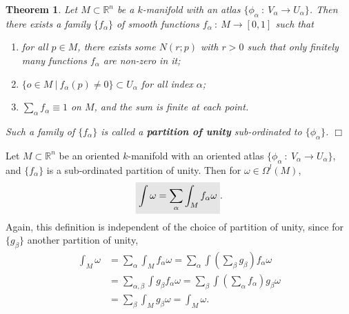 \documentclass[letter-paper]{tufte-book}
\newtheorem{theorem}{\color{pastel-blue}Theorem}[section]
\newcommand{\qedwhite}{\hfill \ensuremath{\Box}}
\newcommand{\highlight}[1]{\mathchoice%
  {\colorbox{black!10}{$\displaystyle#1$}}%
  {\colorbox{black!10}{$\textstyle#1$}}%
  {\colorbox{black!10}{$\scriptstyle#1$}}%
  {\colorbox{black!10}{$\scriptscriptstyle#1$}}}%
\begin{document}
\begin{theorem}
  Let $M \subset \mathbb{R}^n$ be a $k$-manifold with an atlas $\{\phi_\alpha\ :\ V_\alpha \to U_\alpha\}$. Then there exists a family $\{f_\alpha\}$ of smooth functions $f_\alpha\ :\ M \to [0, 1]$ such that
  \begin{enumerate}
    \item for all $p \in M$, there exists some $N(r; p)$ with $r>0$ such that only finitely many functions $f_\alpha$ are non-zero in it;
    \item $\{o \in M\ |\ f_\alpha(p) \neq 0\} \subset U_\alpha$ for all index $\alpha$;
    \item $\sum_\alpha f_\alpha \equiv 1$ on $M$, and the sum is finite at each point.
  \end{enumerate}
  Such a family of $\{f_\alpha\}$ is called a \textbf{partition of unity} sub-ordinated to $\{\phi_\alpha\}$. \qedwhite
\end{theorem}

Let $M \subset \mathbb{R}^n$ be an oriented $k$-manifold with an oriented atlas $\{\phi_\alpha\ :\ V_\alpha \to U_\alpha\}$, and $\{f_\alpha\}$ is a sub-ordinated partition of unity. Then for $\omega \in \Omega^l(M)$,
\begin{equation}
  \highlight{\int\omega = \sum_\alpha \int_M f_\alpha \omega}.
\end{equation}
Again, this definition is independent of the choice of partition of unity, since for $\{g_\beta\}$ another partition of unity,
\begin{align*}
  \int_M \omega
    &= \sum_\alpha \int_M f_\alpha \omega = \sum_\alpha \int (\sum_\beta g_\beta) f_\alpha \omega\\
    &= \sum_{\alpha, \beta} \int g_\beta f_\alpha \omega = \sum_\beta \int (\sum_\alpha f_\alpha) g_\beta \omega\\
    &= \sum_\beta \int_M g_\beta \omega = \int_M \omega.
\end{align*}
\end{document}

